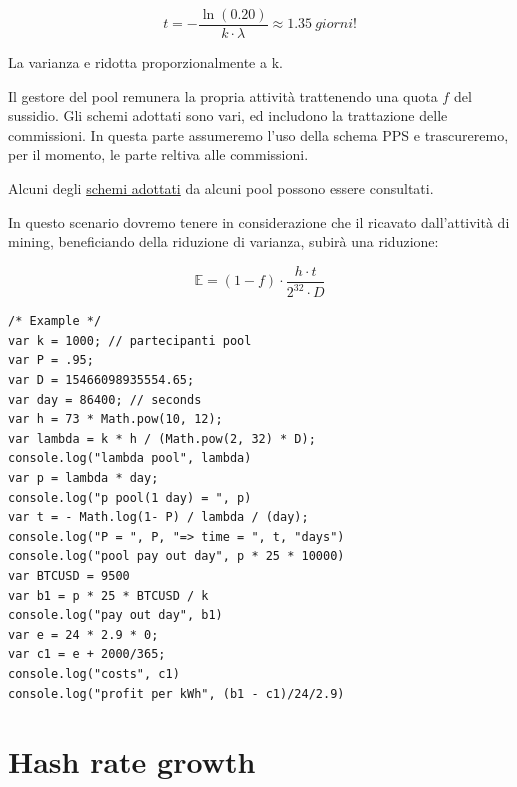 \documentclass{article}
\begin{document}
\begin{equation}
    t = -\frac{\ln(0.20)}{k \cdot \lambda} \approx 1.35 \ \textit{giorni!} 
\end{equation}

La varianza e ridotta proporzionalmente a k.

Il gestore del pool remunera la propria attività trattenendo una quota $f$ del sussidio. Gli schemi adottati sono vari, ed includono la trattazione delle commissioni. 
In questa parte assumeremo l'uso della schema PPS e trascureremo, per il momento, le parte reltiva alle commissioni.

Alcuni degli \href{https://en.bitcoin.it/wiki/Comparison_of_mining_pools}{schemi adottati} da alcuni pool possono essere consultati.

In questo scenario dovremo tenere in considerazione che il ricavato dall'attività di mining, beneficiando della riduzione di varianza,
subirà una riduzione:

\begin{equation}
    \mathbb{E} = (1 - f) \cdot \frac{h \cdot t}{2^{32} \cdot D} \label{adjusted_lambda}
\end{equation}




\lstset{style=mystyle}
\begin{lstlisting}[language=VBScript]
/* Example */
var k = 1000; // partecipanti pool
var P = .95;
var D = 15466098935554.65;
var day = 86400; // seconds
var h = 73 * Math.pow(10, 12);
var lambda = k * h / (Math.pow(2, 32) * D);
console.log("lambda pool", lambda)
var p = lambda * day;
console.log("p pool(1 day) = ", p)
var t = - Math.log(1- P) / lambda / (day);
console.log("P = ", P, "=> time = ", t, "days")
console.log("pool pay out day", p * 25 * 10000)
var BTCUSD = 9500
var b1 = p * 25 * BTCUSD / k
console.log("pay out day", b1)
var e = 24 * 2.9 * 0;
var c1 = e + 2000/365;
console.log("costs", c1)
console.log("profit per kWh", (b1 - c1)/24/2.9)
\end{lstlisting}

\newpage

\section{Hash rate growth}
\end{document}
